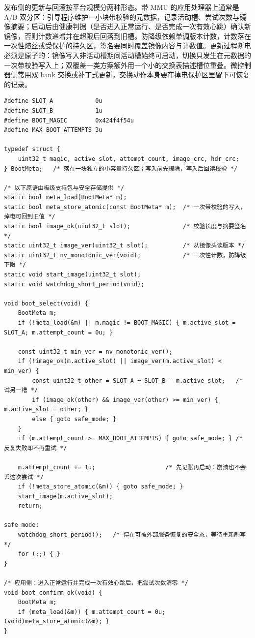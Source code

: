 \documentclass[12pt,a4paper,fontset=fandol]{ctexbook}
\begin{document}
发布侧的更新与回滚按平台规模分两种形态。带 MMU 的应用处理器上通常是 A/B 双分区：引导程序维护一小块带校验的元数据，记录活动槽、尝试次数与镜像摘要；启动后由健康判据（是否进入正常运行、是否完成一次有效心跳）确认新镜像，否则计数递增并在超限后回落到旧槽。防降级依赖单调版本计数，计数落在一次性熔丝或受保护的持久区，签名要同时覆盖镜像内容与计数值。更新过程断电必须是原子的：镜像写入非活动槽期间活动槽始终可启动，切换只发生在元数据的一次带校验写入上；双覆盖一类方案额外用一个小的交换表描述槽位重叠。微控制器侧常用双 bank 交换或补丁式更新，交换动作本身要在掉电保护区里留下可恢复的记录。

\begin{lstlisting}[style=cstyle,caption={C：A/B 槽选择与回滚判据（元数据带校验，尝试超限即回落安全态）},label={lst:ch14-aboot}]
#define SLOT_A            0u
#define SLOT_B            1u
#define BOOT_MAGIC        0x424f4f54u
#define MAX_BOOT_ATTEMPTS 3u

typedef struct {
    uint32_t magic, active_slot, attempt_count, image_crc, hdr_crc;
} BootMeta;   /* 落在一块独立的小容量持久区；写入前先擦除，写入后回读校验 */

/* 以下原语由板级支持包与安全存储提供 */
static bool meta_load(BootMeta* m);
static bool meta_store_atomic(const BootMeta* m);  /* 一次带校验的写入，掉电可回到旧值 */
static bool image_ok(uint32_t slot);               /* 校验长度与摘要签名 */
static uint32_t image_ver(uint32_t slot);          /* 从镜像头读版本 */
static uint32_t nv_monotonic_ver(void);            /* 一次性计数，防降级下限 */
static void start_image(uint32_t slot);
static void watchdog_short_period(void);

void boot_select(void) {
    BootMeta m;
    if (!meta_load(&m) || m.magic != BOOT_MAGIC) { m.active_slot = SLOT_A; m.attempt_count = 0u; }

    const uint32_t min_ver = nv_monotonic_ver();
    if (!image_ok(m.active_slot) || image_ver(m.active_slot) < min_ver) {
        const uint32_t other = SLOT_A + SLOT_B - m.active_slot;   /* 试另一槽 */
        if (image_ok(other) && image_ver(other) >= min_ver) { m.active_slot = other; }
        else { goto safe_mode; }
    }
    if (m.attempt_count >= MAX_BOOT_ATTEMPTS) { goto safe_mode; } /* 反复失败即不再重试 */

    m.attempt_count += 1u;                    /* 先记账再启动：崩溃也不会丢这次尝试 */
    if (!meta_store_atomic(&m)) { goto safe_mode; }
    start_image(m.active_slot);
    return;

safe_mode:
    watchdog_short_period();   /* 停在可被外部服务恢复的安全态，等待重新刷写 */
    for (;;) { }
}

/* 应用侧：进入正常运行并完成一次有效心跳后，把尝试次数清零 */
void boot_confirm_ok(void) {
    BootMeta m;
    if (meta_load(&m)) { m.attempt_count = 0u; (void)meta_store_atomic(&m); }
}
\end{lstlisting}
\end{document}
